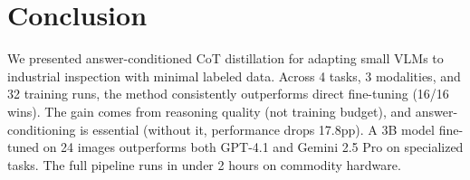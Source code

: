\documentclass[11pt]{article}
\begin{document}
\section{Conclusion}
\label{sec:conclusion}

We presented answer-conditioned CoT distillation for adapting small VLMs to industrial inspection with minimal labeled data. Across 4 tasks, 3 modalities, and 32 training runs, the method consistently outperforms direct fine-tuning (16/16 wins). The gain comes from reasoning quality (not training budget), and answer-conditioning is essential (without it, performance drops 17.8pp). A 3B model fine-tuned on 24 images outperforms both GPT-4.1 and Gemini 2.5 Pro on specialized tasks. The full pipeline runs in under 2 hours on commodity hardware.



\end{document}
